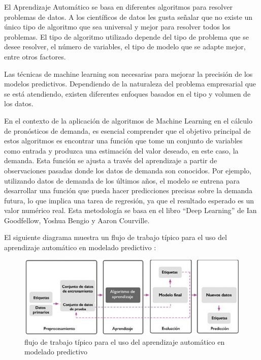\vspace{1\baselineskip}El Aprendizaje Automático se basa en diferentes algoritmos para resolver problemas de datos. A los científicos de datos les gusta señalar que no existe un único tipo de algoritmo que sea universal y mejor para resolver todos los problemas. El tipo de algoritmo utilizado depende del tipo de problema que se desee resolver, el número de variables, el tipo de modelo que se adapte mejor, entre otros factores. 

Las técnicas de machine learning son necesarias para mejorar la precisión de los modelos predictivos. Dependiendo de la naturaleza del problema empresarial que se está atendiendo, existen diferentes enfoques basados en el tipo y volumen de los datos\cite{ibm}.

En el contexto de la aplicación de algoritmos de Machine Learning en el cálculo de pronósticos de demanda, es esencial comprender que el objetivo principal de estos algoritmos es encontrar una función que tome un conjunto de variables como entrada y produzca una estimación del valor deseado, en este caso, la demanda. Esta función se ajusta a través del aprendizaje a partir de observaciones pasadas donde los datos de demanda son conocidos. Por ejemplo, utilizando datos de demanda de los últimos años, el modelo se entrena para desarrollar una función que pueda hacer predicciones precisas sobre la demanda futura, lo que implica una tarea de regresión, ya que el resultado esperado es un valor numérico real. Esta metodología se basa en el libro “Deep Learning” de Ian Goodfellow, Yoshua Bengio y Aaron Courville\cite{goodfellow2016deep}.


El siguiente diagrama muestra un flujo de trabajo típico para el uso del aprendizaje automático en modelado predictivo \cite{mirjalili2020python}:

\begin{figure}[H]
  \begin{center}
    \includegraphics[scale=0.90]{./uso_aprendisaje_automatico.png}
    \caption{ flujo de trabajo típico para el uso del aprendizaje automático en modelado predictivo}
    \label{fig:perceptron}
  \end{center}
\end{figure}

